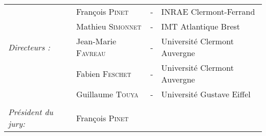 \begin{titlepage}
\begin{center}
\begin{tabular}{llcl}
                              & François \textsc{Pinet}		& - & INRAE Clermont-Ferrand\\
                        	& Mathieu \textsc{Simonnet}		& - & IMT Atlantique Brest \\
      \textit{Directeurs :}	& Jean-Marie \textsc{Favreau}		& - & Université Clermont Auvergne \\
                              & Fabien \textsc{Feschet}		& - & Université Clermont Auvergne\\
                              & Guillaume \textsc{Touya}		& - & Université Gustave Eiffel \\
                              & & & \\
      \textit{Président du jury:} & François \textsc{Pinet} & & \\
\end{tabular}
\end{center}
\end{titlepage}

\sloppy

\titlepage
